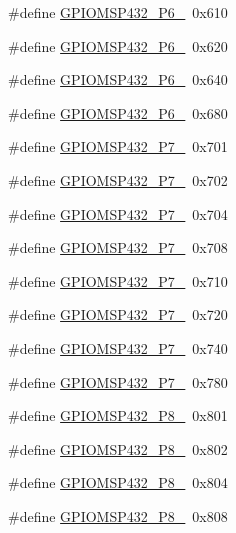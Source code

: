 \begin{DoxyCompactItemize}
\item 
\#define \hyperlink{_g_p_i_o_m_s_p432_8h_aa16551e814744d6a25f3270c94ec2ff2}{G\+P\+I\+O\+M\+S\+P432\+\_\+\+P6\+\_}~0x610
\item 
\#define \hyperlink{_g_p_i_o_m_s_p432_8h_aadfd2349d6bf10efdd7d693ad5a9a5a9}{G\+P\+I\+O\+M\+S\+P432\+\_\+\+P6\+\_}~0x620
\item 
\#define \hyperlink{_g_p_i_o_m_s_p432_8h_a9235db271fbcdad509b8d04b01cbbb71}{G\+P\+I\+O\+M\+S\+P432\+\_\+\+P6\+\_}~0x640
\item 
\#define \hyperlink{_g_p_i_o_m_s_p432_8h_af7bd0125201581a8c37f75186106987d}{G\+P\+I\+O\+M\+S\+P432\+\_\+\+P6\+\_}~0x680
\item 
\#define \hyperlink{_g_p_i_o_m_s_p432_8h_aeec12865215543ac467ba529b24b761a}{G\+P\+I\+O\+M\+S\+P432\+\_\+\+P7\+\_}~0x701
\item 
\#define \hyperlink{_g_p_i_o_m_s_p432_8h_a288218a42511f8ef8fbc651f44069e6b}{G\+P\+I\+O\+M\+S\+P432\+\_\+\+P7\+\_}~0x702
\item 
\#define \hyperlink{_g_p_i_o_m_s_p432_8h_a176559bece91bed40e0b0dee2c10246d}{G\+P\+I\+O\+M\+S\+P432\+\_\+\+P7\+\_}~0x704
\item 
\#define \hyperlink{_g_p_i_o_m_s_p432_8h_aa87b348a7509c5e3a925349ba1cfd164}{G\+P\+I\+O\+M\+S\+P432\+\_\+\+P7\+\_}~0x708
\item 
\#define \hyperlink{_g_p_i_o_m_s_p432_8h_aae1ab969dd892e5d9f1d886e46c30027}{G\+P\+I\+O\+M\+S\+P432\+\_\+\+P7\+\_}~0x710
\item 
\#define \hyperlink{_g_p_i_o_m_s_p432_8h_acfc199d8b177682180515004d66e4444}{G\+P\+I\+O\+M\+S\+P432\+\_\+\+P7\+\_}~0x720
\item 
\#define \hyperlink{_g_p_i_o_m_s_p432_8h_a7928ca40a2817a81493c1a0ba7fabd91}{G\+P\+I\+O\+M\+S\+P432\+\_\+\+P7\+\_}~0x740
\item 
\#define \hyperlink{_g_p_i_o_m_s_p432_8h_add874e24a2520a6c62525b6be8c6ee7d}{G\+P\+I\+O\+M\+S\+P432\+\_\+\+P7\+\_}~0x780
\item 
\#define \hyperlink{_g_p_i_o_m_s_p432_8h_afba058be433fba1aa59ea0813550da1f}{G\+P\+I\+O\+M\+S\+P432\+\_\+\+P8\+\_}~0x801
\item 
\#define \hyperlink{_g_p_i_o_m_s_p432_8h_ac20ec61befb04b5353630eb879af74f9}{G\+P\+I\+O\+M\+S\+P432\+\_\+\+P8\+\_}~0x802
\item 
\#define \hyperlink{_g_p_i_o_m_s_p432_8h_aa17b21a912e1514e5523304eb0af1171}{G\+P\+I\+O\+M\+S\+P432\+\_\+\+P8\+\_}~0x804
\item 
\#define \hyperlink{_g_p_i_o_m_s_p432_8h_ac48222ba05c7ba69258bf2a517400918}{G\+P\+I\+O\+M\+S\+P432\+\_\+\+P8\+\_}~0x808

\end{DoxyCompactItemize}
